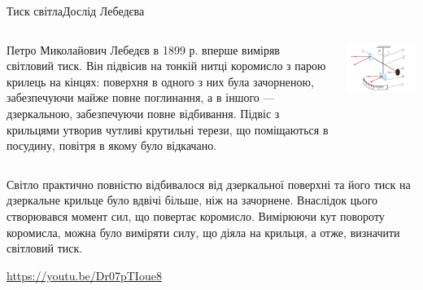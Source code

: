 \documentclass{beamer}
\begin{document}
\begin{frame}{Тиск світла}{Дослід Лебедєва}
	\begin{columns}
		\begin{column}{0.5\linewidth}\small\justifying
			Петро Миколайович Лебедєв в 1899 р. вперше виміряв світловий тиск. Він підвісив на тонкій нитці коромисло з парою крилець на кінцях: поверхня в одного з них була зачорненою, забезпечуючи майже повне поглинання, а в іншого --- дзеркальною, забезпечуючи повне відбивання. Підвіс з крильцями утворив чутливі крутильні терези, що поміщаються в посудину, повітря в якому було відкачано.
		\end{column}
		\begin{column}{0.5\linewidth}\centering
			\includegraphics[width=\linewidth]{LebedevExp}
		\end{column}
	\end{columns}

	\begin{block}{}\small\justifying
		Світло практично повністю відбивалося від дзеркальної поверхні та його тиск на дзеркальне крильце було вдвічі більше, ніж на зачорнене. Внаслідок цього створювався момент сил, що повертає коромисло. Вимірюючи кут повороту коромисла, можна було виміряти силу, що діяла на крильця, а отже, визначити світловий тиск.
	\end{block}
	{\tiny \url{https://youtu.be/Dr07pTIoue8}}
\end{frame}
\end{document}
